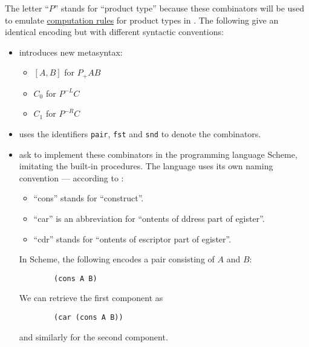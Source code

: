 \begin{example}
\begin{thmenum}
    The letter \enquote{\( P \)} stands for \enquote{product type} because these combinators will be used to emulate \hyperref[rem:type_theory_rule_classification/equality/comp]{computation rules} for product types in . The following give an identical encoding but with different syntactic conventions:
    \begin{itemize}
      \item {} introduces new metasyntax:
      \begin{itemize}
        \item \( [A, B] \) for \( P_+ A B \)
        \item \( C_0 \) for \( P^{-L} C \)
        \item \( C_1 \) for \( P^{-R} C \)
      \end{itemize}

      \item {} uses the identifiers \verb|pair|, \verb|fst| and \verb|snd| to denote the combinators.

      \item {} ask to implement these combinators in the programming language Scheme, imitating the built-in procedures. The language uses its own naming convention --- according to \cite[115]{AbelsonSussman2012eSICP}:
      \begin{itemize}
        \item \enquote{cons} stands for \enquote{construct}.
        \item \enquote{car} is an abbreviation for \enquote{ontents of ddress part of egister}.
        \item \enquote{cdr} stands for \enquote{ontents of escriptor part of egister}.
      \end{itemize}

      In Scheme, the following encodes a pair consisting of \( A \) and \( B \):
      \begin{verbatim}
        (cons A B)
      \end{verbatim}\vspace{-\baselineskip}

      We can retrieve the first component as
      \begin{verbatim}
        (car (cons A B))
      \end{verbatim}\vspace{-\baselineskip}
      and similarly for the second component.
    \end{itemize}


\end{thmenum}
\end{example}
